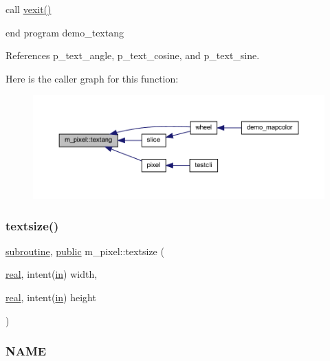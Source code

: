 call \hyperlink{namespacem__pixel_a19ad6b65752322b0029a62cc0ebec3e8}{vexit()}

end program demo\+\_\+textang 

References p\+\_\+text\+\_\+angle, p\+\_\+text\+\_\+cosine, and p\+\_\+text\+\_\+sine.

Here is the caller graph for this function\+:
\nopagebreak
\begin{figure}[H]
\begin{center}
\leavevmode
\includegraphics[width=350pt]{namespacem__pixel_a5e213461e9894b99c9e8f278d5c4a858_icgraph}
\end{center}
\end{figure}
\mbox{\label{namespacem__pixel_a070e9fff1f2cd0c89d40c5d3c72b7f2c}} 
\subsubsection{\texorpdfstring{textsize()}{textsize()}}
{\footnotesize\ttfamily \hyperlink{M__stopwatch_83_8txt_acfbcff50169d691ff02d4a123ed70482}{subroutine}, \hyperlink{M__stopwatch_83_8txt_a2f74811300c361e53b430611a7d1769f}{public} m\+\_\+pixel\+::textsize (\begin{DoxyParamCaption}\item[{\hyperlink{read__watch_83_8txt_abdb62bde002f38ef75f810d3a905a823}{real}, intent(\hyperlink{M__journal_83_8txt_afce72651d1eed785a2132bee863b2f38}{in})}]{width,  }\item[{\hyperlink{read__watch_83_8txt_abdb62bde002f38ef75f810d3a905a823}{real}, intent(\hyperlink{M__journal_83_8txt_afce72651d1eed785a2132bee863b2f38}{in})}]{height }\end{DoxyParamCaption})}



\subsubsection*{N\+A\+ME}

